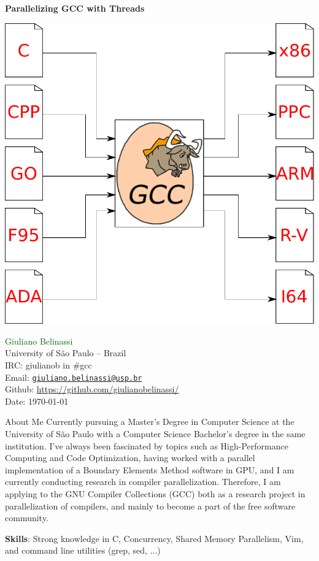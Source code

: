 \documentclass[12pt]{article}
\begin{document}
\newtheorem{theorem}{Teorema}%
\newtheorem{corollary}{Corolário}[theorem]
\newtheorem{lemma}[theorem]{Lema}

\begin{center}
\Huge \bf
Parallelizing GCC with Threads
\vspace{0.5cm}
\end{center}
\vspace*{\fill}
{
     \centering
     \includegraphics[scale=0.7]{logo.pdf}
    \par
}
\vspace*{\fill}
\normalsize{
\noindent\textcolor{darkgreen}{Giuliano Belinassi} \\
University of São Paulo -- Brazil \\
IRC: giulianob in \#gcc \\
Email: \href{mailto:giuliano.belinassi@usp.br}{\texttt{giuliano.belinassi@usp.br}} \\
Github: \url{https://github.com/giulianobelinassi/} \\
Date: \today
}
\newpage

\begin{section}{About Me}
    Currently pursuing a Master's Degree in Computer Science at the University
    of São Paulo with a Computer Science Bachelor's degree in the same
    institution. I've always been fascinated by topics such as
    High-Performance Computing and Code Optimization, having worked with
    a parallel implementation of a Boundary Elements Method software in GPU,
    and I am currently
    conducting research in compiler parallelization. Therefore, I am applying
    to the GNU Compiler Collections
    (GCC) both as a research project in parallelization of compilers, and
    mainly to become a part of the free software community.

    \textbf{Skills}: Strong knowledge in C, Concurrency, Shared Memory Parallelism, Vim, and command line utilities (grep, sed, ...)
\end{section}
\end{document}
